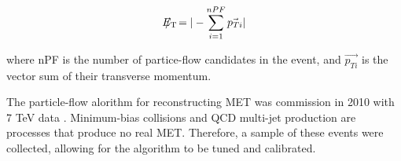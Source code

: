 \begin{equation}\label{eq:met}
E_{\mathrm{T}}\hspace{-1.1em}/\kern0.45em = | - \sum_{i=1}^{nPF} \vec{p_{Ti}} |
\end{equation}

\noindent where nPF is the number of partice-flow candidates in the
event, and $\vec{p_{Ti}}$ is the vector sum of their transverse
momentum.  

\par The particle-flow alorithm for reconstructing MET was commission
in 2010 with 7 TeV data \cite{CMS-PAS-PFT-10-002}.  Minimum-bias
collisions and QCD multi-jet production are processes that produce no
real MET.  Therefore, a sample of these events were collected,
allowing for the algorithm to be tuned and calibrated.  